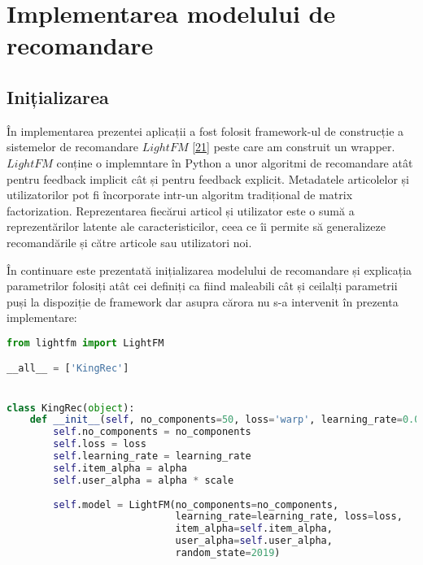 \section{Implementarea modelului de recomandare}
\subsection{Inițializarea}
În implementarea prezentei aplicații a fost folosit framework-ul de construcție a sistemelor de recomandare $LightFM$ \hyperlink{lightfm}{[21]} peste care am construit un wrapper. 
$LightFM$ conține o implemntare în Python a unor algoritmi de recomandare atât pentru feedback implicit cât și pentru feedback explicit. Metadatele articolelor și utilizatorilor pot fi încorporate intr-un algoritm tradițional de matrix factorization. Reprezentarea fiecărui articol și utilizator este o sumă a reprezentărilor latente ale caracteristicilor, ceea ce îi permite să generalizeze recomandările și către articole sau utilizatori noi.   

În continuare este prezentată inițializarea modelului de recomandare și explicația parametrilor folosiți atât cei definiți ca fiind maleabili cât și ceilalți parametrii puși la dispoziție de framework dar asupra cărora nu s-a intervenit în prezenta implementare:
\begin{lstlisting}[language=Python, caption=Definirea modelului de recomandare]
from lightfm import LightFM

__all__ = ['KingRec']


class KingRec(object):
    def __init__(self, no_components=50, loss='warp', learning_rate=0.05, alpha=0.02, scale=0.07):
        self.no_components = no_components
        self.loss = loss
        self.learning_rate = learning_rate
        self.item_alpha = alpha
        self.user_alpha = alpha * scale
        
        self.model = LightFM(no_components=no_components, 
        					 learning_rate=learning_rate, loss=loss,
                             item_alpha=self.item_alpha, 
                             user_alpha=self.user_alpha, 
                             random_state=2019)                       
\end{lstlisting}

